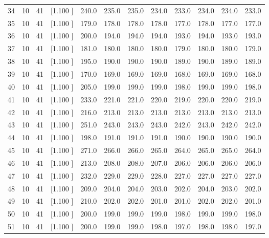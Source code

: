 \documentclass[12pt,a4paper]{article}
\begin{document}
\begin{center}
{\begin{tabular}{r r r r r r r r r r r r}
  34& 10& 41&[1.100     ]&   240.0&   235.0&   235.0&   234.0&   233.0&   234.0&   234.0&   233.0\\[-0.02in]
  35& 10& 41&[1.100     ]&   179.0&   178.0&   178.0&   178.0&   177.0&   178.0&   177.0&   177.0\\[-0.02in]
  36& 10& 41&[1.100     ]&   200.0&   194.0&   194.0&   194.0&   193.0&   194.0&   193.0&   193.0\\[-0.02in]
  37& 10& 41&[1.100     ]&   181.0&   180.0&   180.0&   180.0&   179.0&   180.0&   180.0&   179.0\\[-0.02in]
  38& 10& 41&[1.100     ]&   195.0&   190.0&   190.0&   190.0&   189.0&   190.0&   189.0&   189.0\\[-0.02in]
  39& 10& 41&[1.100     ]&   170.0&   169.0&   169.0&   169.0&   168.0&   169.0&   169.0&   168.0\\[-0.02in]
  40& 10& 41&[1.100     ]&   205.0&   199.0&   199.0&   199.0&   198.0&   199.0&   199.0&   198.0\\[-0.02in]
  41& 10& 41&[1.100     ]&   233.0&   221.0&   221.0&   220.0&   219.0&   220.0&   220.0&   219.0\\[-0.02in]
  42& 10& 41&[1.100     ]&   216.0&   213.0&   213.0&   213.0&   213.0&   213.0&   213.0&   213.0\\[-0.02in]
  43& 10& 41&[1.100     ]&   251.0&   243.0&   243.0&   243.0&   242.0&   243.0&   242.0&   242.0\\[-0.02in]
  44& 10& 41&[1.100     ]&   198.0&   191.0&   191.0&   191.0&   190.0&   190.0&   190.0&   190.0\\[-0.02in]
  45& 10& 41&[1.100     ]&   271.0&   266.0&   266.0&   265.0&   264.0&   265.0&   265.0&   264.0\\[-0.02in]
  46& 10& 41&[1.100     ]&   213.0&   208.0&   208.0&   207.0&   206.0&   206.0&   206.0&   206.0\\[-0.02in]
  47& 10& 41&[1.100     ]&   232.0&   229.0&   229.0&   228.0&   227.0&   227.0&   227.0&   227.0\\[-0.02in]
  48& 10& 41&[1.100     ]&   209.0&   204.0&   204.0&   203.0&   202.0&   204.0&   203.0&   202.0\\[-0.02in]
  49& 10& 41&[1.100     ]&   210.0&   202.0&   202.0&   201.0&   201.0&   202.0&   202.0&   201.0\\[-0.02in]
  50& 10& 41&[1.100     ]&   200.0&   199.0&   199.0&   199.0&   198.0&   199.0&   199.0&   198.0\\[-0.02in]
  51& 10& 41&[1.100     ]&   200.0&   199.0&   199.0&   198.0&   197.0&   198.0&   198.0&   197.0\\[-0.02in]

\end{tabular}}
\end{center}
\end{document}
